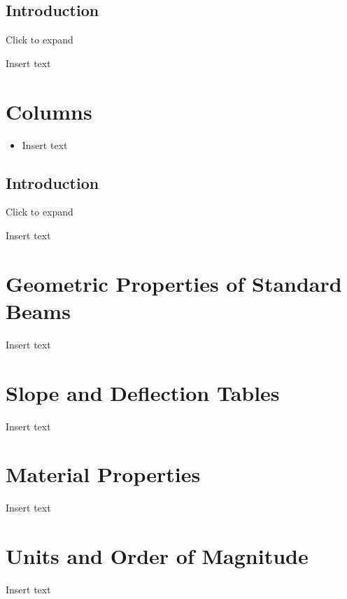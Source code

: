 \documentclass[
  letterpaper,
  DIV=11,
  numbers=noendperiod]{scrreprt}
\providecommand{\tightlist}{%
  \setlength{\itemsep}{0pt}\setlength{\parskip}{0pt}}\usepackage{longtable,booktabs,array}
\begin{document}
\section{Introduction}\label{introduction-14}

Click to expand

Insert text


\chapter{Columns}\label{sec-columns}

\begin{tcolorbox}[enhanced jigsaw, colbacktitle=quarto-callout-note-color!10!white, title={Learning Objectives}, coltitle=black, leftrule=.75mm, rightrule=.15mm, opacityback=0, breakable, colframe=quarto-callout-note-color-frame, left=2mm, arc=.35mm, colback=white, bottomrule=.15mm, bottomtitle=1mm, toptitle=1mm, titlerule=0mm, opacitybacktitle=0.6, toprule=.15mm]

\begin{itemize}
\tightlist
\item
  Insert text
\end{itemize}

\end{tcolorbox}

\section{Introduction}\label{introduction-15}

Click to expand

Insert text

\cleardoublepage
{}
{}
\appendix

\chapter{Geometric Properties of Standard
Beams}\label{geometric-properties-of-standard-beams}

Insert text

\chapter{Slope and Deflection Tables}\label{slope-and-deflection-tables}

Insert text

\chapter{Material Properties}\label{material-properties}

Insert text

\chapter{Units and Order of
Magnitude}\label{units-and-order-of-magnitude}

Insert text
\end{document}
